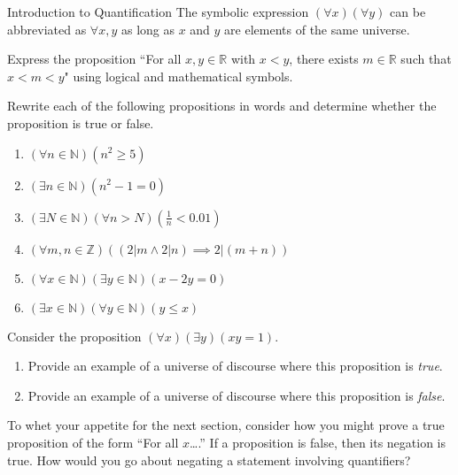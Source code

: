 \begin{section}{Introduction to Quantification}
The symbolic expression $(\forall x)(\forall y)$ can be abbreviated as $\boxed{\forall x,y}$ as long as $x$ and $y$ are elements of the same universe.

\begin{problem}
Express the proposition ``For all $x,y\in\mathbb{R}$ with $x<y$, there exists $m\in\mathbb{R}$ such that $x<m<y$" using logical and mathematical symbols.
\end{problem}

\begin{problem}
Rewrite each of the following propositions in words and determine whether the proposition is true or false.
\begin{enumerate}[label=\textrm{(\alph*)}]
\item $(\forall n \in \mathbb{N})(n^2 \geq 5)$
\item $(\exists n \in \mathbb{N})(n^2-1=0)$
\item $(\exists N \in \mathbb{N})(\forall  n > N)(\frac{1}{n} < 0.01)$
\item $(\forall m, n \in \mathbb{Z})((2|m \wedge 2|n) \implies 2|(m+n))$
\item $(\forall x \in \mathbb{N})(\exists y \in \mathbb{N})(x-2y=0)$
\item $(\exists x \in \mathbb{N})(\forall y \in \mathbb{N})(y \leq x)$
\end{enumerate}
\end{problem}

\begin{problem}
Consider the proposition $(\forall x)(\exists y)(xy=1)$.
\begin{enumerate}[label=\textrm{(\alph*)}]
\item Provide an example of a universe of discourse where this proposition is \emph{true}.
\item Provide an example of a universe of discourse where this proposition is \emph{false}.
\end{enumerate}
\end{problem}

To whet your appetite for the next section, consider how you might prove a true proposition of the form ``For all $x$\ldots.'' If a proposition is false, then its negation is true. How would you go about negating a statement involving quantifiers? 

\end{section}